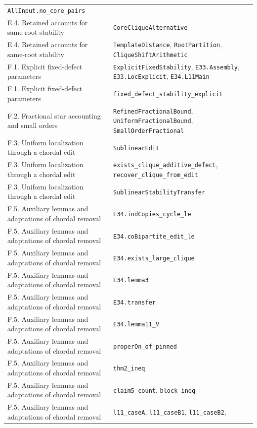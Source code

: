 \documentclass[english,11pt,a4paper]{article}
\begin{document}
{\begin{longtable}[]{@{}
  >{\raggedright\arraybackslash}p{}
  >{\raggedright\arraybackslash}p{}@{}}
\nolinkurl{AllInput.no_core_pairs} \\
E.4. Retained accounts for same-root stability &
\nolinkurl{CoreCliqueAlternative} \\
E.4. Retained accounts for same-root stability &
\nolinkurl{TemplateDistance}, \nolinkurl{RootPartition},
\nolinkurl{CliqueShiftArithmetic} \\
F.1. Explicit fixed-defect parameters & \nolinkurl{ExplicitFixedStability},
\nolinkurl{E33.Assembly}, \nolinkurl{E33.LocExplicit}, \nolinkurl{E34.L11Main} \\
F.1. Explicit fixed-defect parameters &
\nolinkurl{fixed_defect_stability_explicit} \\
F.2. Fractional star accounting and small orders &
\nolinkurl{RefinedFractionalBound}, \nolinkurl{UniformFractionalBound},
\nolinkurl{SmallOrderFractional} \\
F.3. Uniform localization through a chordal edit &
\nolinkurl{SublinearEdit} \\
F.3. Uniform localization through a chordal edit &
\nolinkurl{exists_clique_additive_defect},
\nolinkurl{recover_clique_from_edit} \\
F.3. Uniform localization through a chordal edit &
\nolinkurl{SublinearStabilityTransfer} \\
F.5. Auxiliary lemmas and adaptations of chordal removal &
\nolinkurl{E34.indCopies_cycle_le} \\
F.5. Auxiliary lemmas and adaptations of chordal removal &
\nolinkurl{E34.coBipartite_edit_le} \\
F.5. Auxiliary lemmas and adaptations of chordal removal &
\nolinkurl{E34.exists_large_clique} \\
F.5. Auxiliary lemmas and adaptations of chordal removal &
\nolinkurl{E34.lemma3} \\
F.5. Auxiliary lemmas and adaptations of chordal removal &
\nolinkurl{E34.transfer} \\
F.5. Auxiliary lemmas and adaptations of chordal removal &
\nolinkurl{E34.lemma11_V} \\
F.5. Auxiliary lemmas and adaptations of chordal removal &
\nolinkurl{properOn_of_pinned} \\
F.5. Auxiliary lemmas and adaptations of chordal removal &
\nolinkurl{thm2_ineq} \\
F.5. Auxiliary lemmas and adaptations of chordal removal &
\nolinkurl{claim5_count}, \nolinkurl{block_ineq} \\
F.5. Auxiliary lemmas and adaptations of chordal removal &
\nolinkurl{l11_caseA}, \nolinkurl{l11_caseB1}, \nolinkurl{l11_caseB2},

\end{longtable}}
\end{document}
